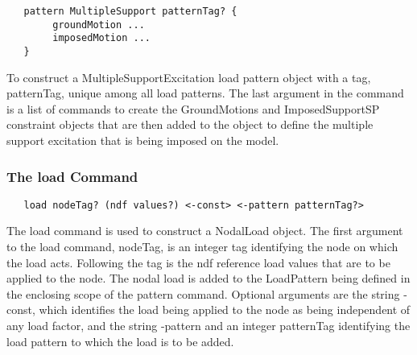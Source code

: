 \documentclass[12pt]{article}
\begin{document}
{\sf\small
\begin{verbatim}
   pattern MultipleSupport patternTag? {
        groundMotion ...
        imposedMotion ...
   }	
\end{verbatim}
}


\noindent To construct a MultipleSupportExcitation load pattern object
with a tag, patternTag, unique among all load patterns. 
The last argument in the command is a list of commands to
create the GroundMotions and ImposedSupportSP constraint objects that
are then added to the object to define the multiple support excitation
that is being imposed on the model.


%


\subsubsection{The load Command}
{\sf\small
\begin{verbatim}
   load nodeTag? (ndf values?) <-const> <-pattern patternTag?>
\end{verbatim}
}

The load command is used to construct a NodalLoad object. The first
argument to the load command, nodeTag, is an integer tag identifying the
node on which the load acts. Following the tag is the ndf reference
load values that are to be applied to the node. The nodal load is
added to the LoadPattern being defined in the enclosing scope of the
pattern command. Optional arguments are the string -const, which
identifies the load being applied to the node as being independent of
any load factor, and the string -pattern and an integer patternTag
identifying the load pattern to which the load is to be added.
\end{document}
